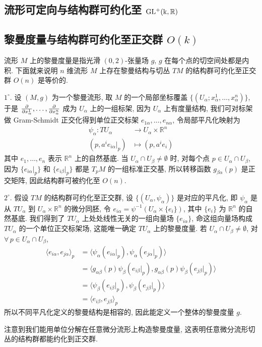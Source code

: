     \subsection{流形可定向与结构群可约化至 ${\rm GL^+(k,\mathbb{R})}$}

    \subsection{黎曼度量与结构群可约化至正交群 $O(k)$}
    流形 $M$ 上的黎曼度量是指光滑 $(0,2)$-张量场 $g$, $g$ 在每个点的切空间处都是内积.
    下面就来说明 $n$ 维流形 $M$ 上存在黎曼结构与切丛 $TM$ 的结构群可约化至正交群 $O(n)$ 是等价的.

    $1^{\circ}.$ 设 $(M,g)$ 为一个黎曼流形, 取 $M$ 的一个局部坐标覆盖 $\{(U_{\alpha};x^1_{\alpha},\dots,x^n_{\alpha})\}$, 于是 $\frac{\partial }{\partial x^1_{\alpha}},\dots,\frac{\partial }{\partial x^n_{\alpha}}$ 成为 $U_{\alpha}$ 上的一组标架, 因为 $U_{\alpha}$ 上有度量结构, 
    我们可对标架做 Gram-Schmidt 正交化得到单位正交标架 $e_{1\alpha},\dots,e_{n\alpha}$, 令局部平凡化映射为
    \begin{align*}
        \psi_{\alpha}:TU_{\alpha}&\rightarrow U_{\alpha}\times\mathbb{R}^n \\
        (p,a^ie_{i\alpha}|_p)&\mapsto(p,a^ie_i)
    \end{align*}
    其中 $e_1,\dots,e_n$ 表示 $\mathbb{R}^n$ 上的自然基底. 当 $U_{\alpha}\cap U_{\beta}\neq\emptyset$ 时, 对每个点 $p\in U_{\alpha}\cap U_{\beta}$, 因为 $\{e_{i\alpha}|_p\}$ 和 $\{e_{i\beta}|_p\}$ 都是 $T_pM$ 的一组标准正交基, 
    所以转移函数 $g_{\beta\alpha}(p)$ 是正交矩阵, 因此结构群可被约化至 $O(n)$.

    $2^{\circ}.$ 假设 $TM$ 的结构群可约化至正交群, 设 $\{(U_{\alpha},\psi_{\alpha})\}$ 是对应的平凡化, 即 $\psi_{\alpha}$ 是从 $TU_{\alpha}$ 到 $U_{\alpha}\times\mathbb{R}^n$ 的微分同胚, 
    令 $e_{i\alpha} = \psi^{-1}(U_{\alpha}\times \{e_i\})$, 其中 $\{e_i\}$ 为 $\mathbb{R}^n$ 的自然基底. 我们得到了 $TU_{\alpha}$ 上处处线性无关的一组向量场 $\{e_{i\alpha}\}$, 命这组向量场构成 $TU_{\alpha}$ 的一个单位正交标架场, 这能唯一确定 $TU_{\alpha}$ 上的黎曼度量.
    若 $U_{\alpha}\cap U_{\beta}\neq\emptyset$, 对 $\forall\,p\in U_{\alpha}\cap U_{\beta}$, 
    \begin{align*}
        \langle e_{i\alpha},e_{j\alpha}\rangle_p &= \langle\psi_{\alpha}(e_{i\alpha}|_p),\psi_{\alpha}(e_{j\alpha}|_p)\rangle \\
        &= \langle g_{\alpha\beta}(p)\psi_{\beta}(e_{i\beta}|_p),g_{\alpha\beta}(p)\psi_{\beta}(e_{j\beta}|_p)\rangle \\
        &= \langle\psi_{\beta}(e_{i\beta}|_p),\psi_{\beta}(e_{j\beta}|_p)\rangle \\
        &= \langle e_{i\beta},e_{j\beta}\rangle_p
    \end{align*}
    所以不同平凡化定义的黎曼结构是相容的, 因此能定义一个整体的黎曼度量 $g$.

    注意到我们能用单位分解在任意微分流形上构造黎曼度量, 这表明任意微分流形切丛的结构群都能约化到正交群.